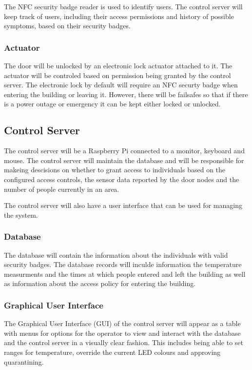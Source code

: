 The NFC security badge reader is used to identify users. The control server will
keep track of users, including their access permissions and history of possible
symptoms, based on their security badges.

\subsubsection{Actuator}
The door will be unlocked by an electronic lock actuator attached to it. The
actuator will be controled based on permission being granted by the control
server. The electronic lock by default will require an NFC securty badge when
entering the building or leaving it. However, there will be failsafes so that if
there is a power outage or emergency it can be kept either locked or unlocked.

\subsection{Control Server}
The control server will be a Raspberry Pi connected to a monitor, keyboard and
mouse. The control server will maintain the database and will be responsible for
makeing descisions on whether to grant access to individuals based on the
configured access controls, the sensor data reported by the door nodes and the 
number of people currently in an area. 

The control server will also have a user interface that can be used for managing
the system.

\subsubsection{Database}
The database will contain the information about the individuals with valid
security badges. The database records will inculde information the temperature
measurments and the times at which people entered and left the building as well
as information about the access policy for entering the building.

\subsubsection{Graphical User Interface}
The Graphical User Interface (GUI) of the control server will appear as a table
with menus for options for the operator to view and interact with the database 
and the control server in a visually clear fashion. This includes being able to
set ranges for temperature, override the current LED colours and approving
quarantining.

